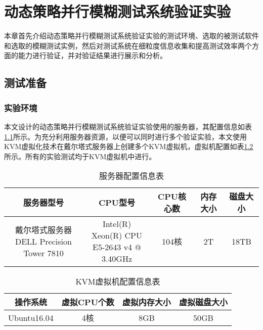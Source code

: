 \documentclass[master]{thesis-uestc}
\begin{document}
\chapter{动态策略并行模糊测试系统验证实验}

本章首先介绍动态策略并行模糊测试系统验证实验的测试环境、选取的被测试软件和选取的模糊测试实例，然后对测试系统在细粒度信息收集和提高测试效率两个方面的能力进行验证，并对验证结果进行展示和分析。

\section{测试准备}
\subsection{实验环境}

本文设计的动态策略并行模糊测试系统验证实验使用的服务器，其配置信息如表\ref{table_server}所示。为充分利用服务器资源，以便可以同时进行多个验证实验，本文使用KVM虚拟化技术在戴尔塔式服务器上创建多个KVM虚拟机，虚拟机配置如表\ref{table_kvm}所示。所有的实验测试均于KVM虚拟机中进行。

\begin{table}[!htbp]
    \caption{服务器配置信息表}
    \begin{tabular}{ccccc}
    \toprule
    服务器型号 & CPU型号 & CPU核心数 & 内存大小 & 磁盘大小 \\
    \midrule
    \makecell[l]{戴尔塔式服务器 \\ DELL Precision Tower 7810}
 & \makecell[l]{Intel(R) Xeon(R) CPU \\ E5-2643 v4 @ 3.40GHz} & 104核 & 2T & 18TB \\
    \bottomrule
    \end{tabular}
    \label{table_server}
    \vspace{6pt}
\end{table}

\begin{table}[!htbp]
    \caption{KVM虚拟机配置信息表}
    \begin{tabular}{cccc}
    \toprule
    操作系统 & 虚拟CPU个数 & 虚拟内存大小 & 虚拟磁盘大小 \\
    \midrule
    Ubuntu16.04 & 4核 & 8GB & 50GB \\
    \bottomrule
    \end{tabular}
    \label{table_kvm}
    \vspace{6pt}
\end{table}
\end{document}
